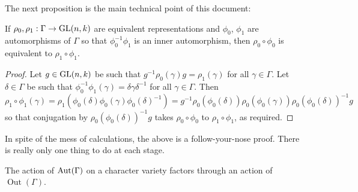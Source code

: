 \documentclass[11pt, oneside, usenames, dvipsnames, svgnames, table, final]{amsart}
\newcommand{\Out}{\operatorname{Out}}
\begin{document}
The next proposition is the main technical point of this document:
\begin{proposition}
  If $\rho_0, \rho_1 : \Gamma \to \operatorname{GL}(n,k)$ are equivalent representations and $\phi_0$, $\phi_1$ are automorphisms of
  $\Gamma$ so that $\phi_0^{-1} \phi_1$ is an inner automorphism, then $\rho_0 \circ \phi_0$ is equivalent to $\rho_1
  \circ \phi_1$.
\end{proposition}
\begin{proof}
  Let $g \in \operatorname{GL}(n,k)$ be such that $g^{-1} \rho_0(\gamma) g = \rho_1(\gamma)$ for all $\gamma \in \Gamma$. Let $\delta \in \Gamma$ be such that
  $\phi_0^{-1} \phi_1(\gamma) = \delta \gamma \delta^{-1}$ for all $\gamma \in \Gamma$. Then
  \[ \rho_1 \circ \phi_1(\gamma) = \rho_1(\phi_0(\delta) \phi_0(\gamma) \phi_0(\delta)^{-1}) = g^{-1}
    \rho_0(\phi_0(\delta)) \rho_0(\phi_0(\gamma)) \rho_0(\phi_0(\delta))^{-1} g \]
  so that conjugation by $\rho_0(\phi_0(\delta))^{-1} g$ takes $\rho_0 \circ \phi_0$ to $\rho_1 \circ \phi_1$, as required.
\end{proof}
\begin{remark}
  In spite of the mess of calculations, the above is a follow-your-nose proof. There is really only one thing to do at
  each stage.
\end{remark}

\begin{corollary}
  The action of $\operatorname{Aut}(\Gamma)$ on a character variety factors through an action of $\Out(\Gamma)$.
\end{corollary}
\end{document}
